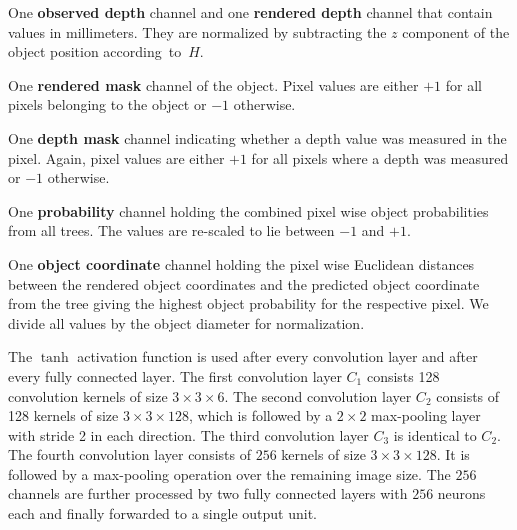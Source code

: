\documentclass[10pt,letterpaper]{article}
\begin{document}
\noindent One {\bf observed depth} channel and one {\bf rendered depth} channel that contain values in millimeters. They are normalized by subtracting the $z$ component of the object position according~to~$H$.

\noindent One {\bf rendered mask} channel of the object. Pixel values are either $+1$ for all pixels belonging to the object or $-1$ otherwise.

\noindent One {\bf depth mask} channel indicating whether a depth value was measured in the pixel. Again, pixel values are either $+1$ for all pixels where a depth was measured or $-1$ otherwise.

\noindent One {\bf probability} channel holding the combined pixel wise object probabilities from all trees. The values are re-scaled to lie between $-1$ and $+1$. 

\noindent One {\bf object coordinate} channel holding the pixel wise Euclidean distances between the rendered object coordinates and the predicted object coordinate from the tree giving the highest object probability for the respective pixel. We divide all values by the object diameter for normalization.

The $\tanh$ activation function is used after every convolution layer and after every fully connected layer. The first convolution layer $C_1$ consists 128 convolution kernels of size $3 \times 3 \times 6$. The second convolution layer $C_2$ consists of 128 kernels of size $3 \times 3 \times 128$, which is followed by a $2 \times 2$ max-pooling layer with stride 2 in each direction. The third convolution layer $C_3 $ is identical to $C_2$. The fourth convolution layer consists of $256$ kernels of size $3 \times 3 \times 128$. It is followed by a max-pooling operation over the remaining image size. The $256$ channels are further processed by two fully connected layers with $256$ neurons each and finally forwarded to a single output unit.

\end{document}
